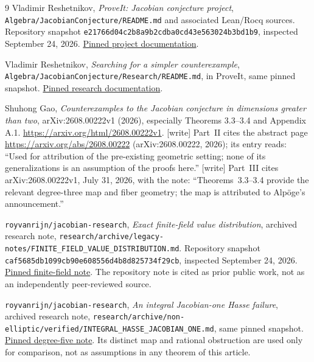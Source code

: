 \documentclass[11pt]{article}
\numberwithin{equation}{section}
\theoremstyle{plain}
\theoremstyle{plain}
\theoremstyle{plain}
\theoremstyle{definition}
\theoremstyle{definition}
\theoremstyle{definition}
\theoremstyle{remark}
\newcommand{\psha}{\nolinkurl{e21766d04c2b8a9b2cdba0cd43e563024b3bd1b9}}
\newcommand{\rsha}{\nolinkurl{caf5685db1099cb90e608556d4b8d825734f29cb}}
\newcommand{\wtag}{\textup{[write]}}%
\begin{document}
\clearpage
\begin{thebibliography}{9}
Vladimir Reshetnikov, \emph{ProveIt: Jacobian conjecture project},
\nolinkurl{Algebra/JacobianConjecture/README.md} and associated Lean/Rocq
sources. Repository snapshot \psha, inspected September 24, 2026.
\href{https://github.com/VladimirReshetnikov/ProveIt/blob/e21766d04c2b8a9b2cdba0cd43e563024b3bd1b9/Algebra/JacobianConjecture/README.md}{Pinned project documentation}.

Vladimir Reshetnikov, \emph{Searching for a simpler counterexample},
\nolinkurl{Algebra/JacobianConjecture/Research/README.md}, in ProveIt,
same pinned snapshot.
\href{https://github.com/VladimirReshetnikov/ProveIt/blob/e21766d04c2b8a9b2cdba0cd43e563024b3bd1b9/Algebra/JacobianConjecture/Research/README.md}{Pinned research documentation}.

Shuhong Gao, \emph{Counterexamples to the Jacobian conjecture in dimensions
greater than two}, arXiv:2608.00222v1 (2026), especially
Theorems 3.3--3.4 and Appendix A.1.
\url{https://arxiv.org/html/2608.00222v1}.
\wtag{} Part~II cites the abstract page
\url{https://arxiv.org/abs/2608.00222} (arXiv:2608.00222, 2026); its
entry reads: ``Used for attribution of the pre-existing geometric
setting; none of its generalizations is an assumption of the proofs
here.''
\wtag{} Part~III cites arXiv:2608.00222v1, July 31, 2026, with the note:
``Theorems~3.3--3.4 provide the relevant degree-three map and fiber
geometry; the map is attributed to Alp\"oge's announcement.''

\texttt{royvanrijn/jacobian-research}, \emph{Exact finite-field value
distribution}, archived research note,
\nolinkurl{research/archive/legacy-notes/FINITE_FIELD_VALUE_DISTRIBUTION.md}.
Repository snapshot \rsha, inspected September 24, 2026.
\href{https://github.com/royvanrijn/jacobian-research/blob/caf5685db1099cb90e608556d4b8d825734f29cb/research/archive/legacy-notes/FINITE_FIELD_VALUE_DISTRIBUTION.md}{Pinned finite-field note}.
The repository note is cited as prior public work, not as an independently
peer-reviewed source.

\texttt{royvanrijn/jacobian-research}, \emph{An integral Jacobian-one Hasse
failure}, archived research note,
\nolinkurl{research/archive/non-elliptic/verified/INTEGRAL_HASSE_JACOBIAN_ONE.md},
same pinned snapshot.
\href{https://github.com/royvanrijn/jacobian-research/blob/caf5685db1099cb90e608556d4b8d825734f29cb/research/archive/non-elliptic/verified/INTEGRAL_HASSE_JACOBIAN_ONE.md}{Pinned degree-five note}.
Its distinct map and rational obstruction are used only for comparison,
not as assumptions in any theorem of this article.


\end{thebibliography}
\end{document}
